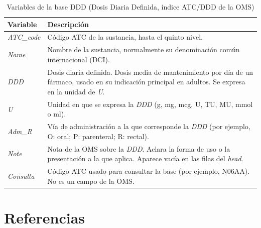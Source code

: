 \documentclass[10pt,twoside,xcolor=table,x11anmes]{IEEEtran}
\begin{document}
\begin{table}[!t]
\caption{Variables de la base DDD (Dosis Diaria Definida, índice ATC/DDD de la OMS)}\label{tab:ddd}
\centering
\footnotesize
\renewcommand{\arraystretch}{1.15}
\begin{tabular}{>{\raggedright\arraybackslash}p{} >{\raggedright\arraybackslash}p{}}
\toprule
\textbf{Variable} & \textbf{Descripción} \\
\midrule
\textit{ATC\_code} & Código ATC de la sustancia, hasta el quinto nivel. \\
\textit{Name} & Nombre de la sustancia, normalmente su denominación común internacional (DCI). \\
\textit{DDD} & Dosis diaria definida. Dosis media de mantenimiento por día de un fármaco, usado en su indicación principal en adultos. Se expresa en la unidad de \textit{U}. \\
\textit{U} & Unidad en que se expresa la \textit{DDD} (g, mg, mcg, U, TU, MU, mmol o ml). \\
\textit{Adm\_R} & Vía de administración a la que corresponde la \textit{DDD} (por ejemplo, O: oral; P: parenteral; R: rectal). \\
\textit{Note} & Nota de la OMS sobre la \textit{DDD}. Aclara la forma de uso o la presentación a la que aplica. Aparece vacía en las filas del \textit{head}. \\
\textit{Consulta} & Código ATC usado para consultar la base (por ejemplo, N06AA). No es un campo de la OMS. \\
\bottomrule
\end{tabular}
\end{table}



\section{Referencias}
\end{document}

